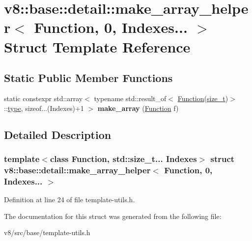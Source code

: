\hypertarget{structv8_1_1base_1_1detail_1_1make__array__helper_3_01Function_00_010_00_01Indexes_8_8_8_01_4}{}\section{v8\+:\+:base\+:\+:detail\+:\+:make\+\_\+array\+\_\+helper$<$ Function, 0, Indexes... $>$ Struct Template Reference}
\label{structv8_1_1base_1_1detail_1_1make__array__helper_3_01Function_00_010_00_01Indexes_8_8_8_01_4}
\subsection*{Static Public Member Functions}
\begin{DoxyCompactItemize}
\item 
\mbox{\label{structv8_1_1base_1_1detail_1_1make__array__helper_3_01Function_00_010_00_01Indexes_8_8_8_01_4_a35a4396bb351ecf08d58e1130aaab657}} 
static constexpr std\+::array$<$ typename std\+::result\+\_\+of$<$ \mbox{\hyperlink{classv8_1_1Function}{Function}}(\mbox{\hyperlink{classsize__t}{size\+\_\+t}})$>$\+::\mbox{\hyperlink{classstd_1_1conditional_1_1type}{type}}, sizeof...(Indexes)+1 $>$ {\bfseries make\+\_\+array} (\mbox{\hyperlink{classv8_1_1Function}{Function}} f)
\end{DoxyCompactItemize}


\subsection{Detailed Description}
\subsubsection*{template$<$class Function, std\+::size\+\_\+t... Indexes$>$\newline
struct v8\+::base\+::detail\+::make\+\_\+array\+\_\+helper$<$ Function, 0, Indexes... $>$}



Definition at line 24 of file template-\/utils.\+h.



The documentation for this struct was generated from the following file\+:\begin{DoxyCompactItemize}
\item 
v8/src/base/template-\/utils.\+h\end{DoxyCompactItemize}
